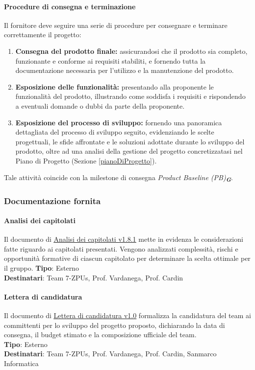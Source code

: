 \documentclass[a4paper,12pt]{article}
\newcommand{\glossario}[1]{\textit{#1}\textsubscript{\textbf{\textit{\textcolor{lightblack}{G}}}}}
\begin{document}
\paragraph{Procedure di consegna e terminazione}
Il fornitore deve seguire una serie di procedure per consegnare e terminare correttamente il progetto:
\begin{enumerate}
    \item \textbf{Consegna del prodotto finale:}  assicurandosi che il prodotto sia completo, funzionante e conforme ai requisiti stabiliti, e fornendo tutta la documentazione necessaria per l'utilizzo e la manutenzione del prodotto.
    \item \textbf{Esposizione delle funzionalità:} presentando alla proponente le funzionalità del prodotto, illustrando come soddisfa i requisiti e rispondendo a eventuali domande o dubbi da parte della proponente.
    \item \textbf{Esposizione del processo di sviluppo:}  fornendo una panoramica dettagliata del processo di sviluppo seguito, evidenziando le scelte progettuali, le sfide affrontate e le soluzioni adottate durante lo sviluppo del prodotto, oltre ad una analisi della gestione del progetto concretizzatasi nel Piano di Progetto (Sezione \ref{pianoDiProgetto}).
\end{enumerate}
Tale attività coincide con la milestone di consegna \glossario{Product Baseline (PB)}.


\subsubsection{Documentazione fornita}

\paragraph{Analisi dei capitolati}\label{analisiDeiCapitolati}
Il documento di \href{https://cdn.jsdelivr.net/gh/7-zpus/Docs@main/1_Candidatura/AnalisiCapitolati.pdf}{\ul{Analisi dei capitolati v1.8.1}} mette in evidenza le considerazioni fatte riguardo ai capitolati presentati.
Vengono analizzati complessità, rischi e opportunità formative di ciascun capitolato per determinare la scelta ottimale per il gruppo.
\textbf{Tipo}: Esterno \\
\textbf{Destinatari}: Team 7-ZPUs, Prof. Vardanega, Prof. Cardin \\


\paragraph{Lettera di candidatura}\label{letteraDiCandidatura}
Il documento di \href{https://cdn.jsdelivr.net/gh/7-zpus/Docs@main/1_Candidatura/LetteraDiPresentazione.pdf}{\ul{Lettera di candidatura v1.0}} formalizza la candidatura del team ai committenti per lo sviluppo del progetto proposto, dichiarando la data di consegna, il budget stimato e la composizione ufficiale del team. \\
\textbf{Tipo}: Esterno \\
\textbf{Destinatari}: Team 7-ZPUs, Prof. Vardanega, Prof. Cardin, Sanmarco Informatica \\
\end{document}
